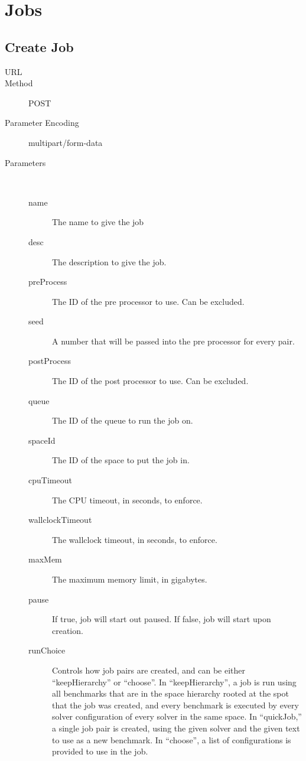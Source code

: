 \chapter{Jobs}

\section{Create Job}
\begin{description}
\item [URL] 
\item [Method] POST
\item [Parameter Encoding] multipart/form-data
\item [Parameters] \
	\begin{description}
	\item [name]  The name to give the job
	\item [desc] \type{String} The description to give the job.
	\item [preProcess]  The ID of the pre processor to use. Can be excluded.
	\item [seed]  A number that will be passed into the pre processor for every pair.
	\item [postProcess]  The ID of the post processor to use. Can be excluded.
	\item [queue]  The ID of the queue to run the job on.
	\item [spaceId]  The ID of the space to put the job in.
	\item [cpuTimeout]  The CPU timeout, in seconds, to enforce.
	\item [wallclockTimeout] \type{Integer} The wallclock timeout, in seconds, to enforce.
	\item [maxMem] \type{Float} The maximum memory limit, in gigabytes.
	\item [pause] \type{Boolean} If true, job will start out paused. If false, job will start upon creation.
	\item [runChoice] \type{String} Controls how job pairs are created, and can be either “keepHierarchy” or “choose”. In “keepHierarchy”, a job is run using all benchmarks that are in the space hierarchy rooted at the spot that the job was created, and every benchmark is executed by every solver configuration of every solver in the same space. In “quickJob,” a single job pair is created, using the given solver and the given text to use as a new benchmark. In “choose”, a list of configurations is provided to use in the job.

\end{description}
\end{description}

